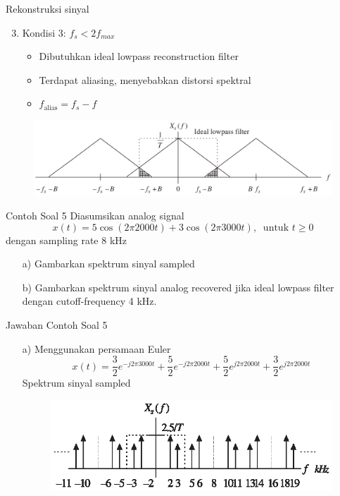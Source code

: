 \documentclass[pdflatex,compress,mathserif]{beamer}
\begin{document}
\begin{frame}{Rekonstruksi sinyal}
    \begin{enumerate}
        \setcounter{enumi}{2}
        \item Kondisi 3: $f_s < 2f_{max}$
        \begin{itemize}
            \item Dibutuhkan ideal lowpass reconstruction filter
            \item Terdapat aliasing, menyebabkan distorsi spektral
            \item $f_\text{alias} = f_s - f$
        \end{itemize}
    \end{enumerate}
    \begin{figure}
        \includegraphics[width=\linewidth]{img/img17.png}
    \end{figure}
\end{frame}

\begin{frame}{Contoh Soal 5}
    Diasumsikan analog signal $$ x(t) = 5 \cos(2\pi 2000 t) + 3\cos(2\pi 3000t),~\text{ untuk } t \geq 0 $$ dengan sampling rate 8 kHz
    \begin{enumerate}
        \item[a)] Gambarkan spektrum sinyal sampled
        \item[b)] Gambarkan spektrum sinyal analog recovered jika ideal lowpass filter dengan cutoff-frequency 4 kHz.
    \end{enumerate}
\end{frame}

\begin{frame}{Jawaban Contoh Soal 5}
    \begin{enumerate}
        \item[a)] Menggunakan persamaan Euler
        $$x(t) = \frac{3}{2}e^{-j2 \pi 3000 t} + \frac{5}{2}e^{-j2 \pi 2000 t} + \frac{5}{2}e^{j2 \pi 2000 t} + \frac{3}{2}e^{j2 \pi 2000 t} $$
        Spektrum sinyal sampled
        \begin{figure}
            \includegraphics[width=\linewidth]{img/img18}
        \end{figure}
    \end{enumerate}
\end{frame}
\end{document}
